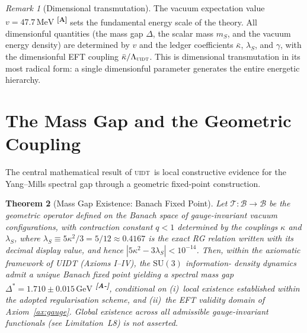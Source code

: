 \documentclass[12pt,a4paper,twoside]{article}
\theoremstyle{plain}
\newtheorem{theorem}{Theorem}[section]
\theoremstyle{definition}
\theoremstyle{remark}
\newtheorem{remark}[theorem]{Remark}
\newcommand{\UIDT}{\textsc{uidt}}
\newcommand{\GeV}{\,\mathrm{GeV}}
\newcommand{\MeV}{\,\mathrm{MeV}}
\newcommand{\catmark}[1]{\textsuperscript{\textsf{\textbf{[#1]}}}}
\newcommand{\DeltaGap}{1.710 \pm 0.015\GeV}        %
\newcommand{\vVEV}{47.7\MeV}                        %
\begin{document}
\begin{remark}[Dimensional transmutation]
The vacuum expectation value $v = \vVEV$ \catmark{A} sets the fundamental
energy scale of the theory. All dimensionful quantities (the mass gap $\Delta$,
the scalar mass $m_S$, and the vacuum energy density) are determined by $v$ and
the ledger coefficients $\bar{\kappa}$, $\lambda_S$, and $\gamma$, with the
dimensionful EFT coupling $\bar{\kappa}/\Lambda_{\UIDT}$. This is
dimensional transmutation in its most radical form: a single dimensionful
parameter generates the entire energetic hierarchy.
\end{remark}



\section{The Mass Gap and the Geometric Coupling}
\label{sec:massgap}

The central mathematical result of \UIDT\ is local constructive evidence for
the Yang--Mills spectral gap through a geometric fixed-point construction.

\begin{theorem}[Mass Gap Existence: Banach Fixed Point]
\label{thm:massgap}
Let $\mathcal{T}: \mathcal{B} \to \mathcal{B}$ be the geometric operator
defined on the Banach space of gauge-invariant vacuum configurations, with
contraction constant $q < 1$ determined by the couplings $\kappa$ and
$\lambda_S$, where $\lambda_S \equiv 5\kappa^2/3=5/12\approx0.4167$ is the
exact RG relation written with its decimal display value, and hence
$|5\kappa^2 - 3\lambda_S| < 10^{-14}$. Then, within the axiomatic framework of UIDT (Axioms I--IV), the $\mathrm{SU}(3)$ information-
density dynamics admit a unique Banach fixed point yielding a spectral mass gap
$\Delta^* = \DeltaGap$ \catmark{A-}, conditional on (i)~local existence established within the
adopted regularisation scheme, and (ii)~the EFT validity domain of Axiom~\ref{ax:gauge}.
Global existence across all admissible gauge-invariant functionals (see Limitation~L8) is not asserted.
\end{theorem}
\end{document}
